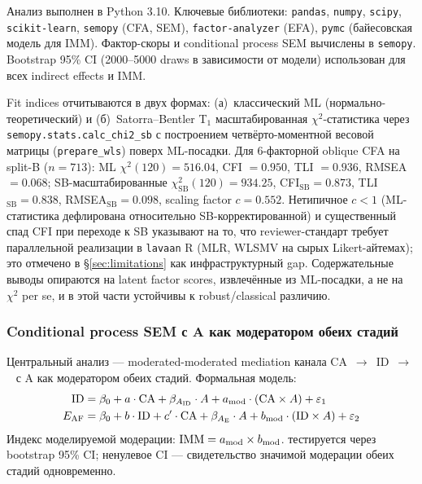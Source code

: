 Анализ выполнен в Python 3.10. Ключевые библиотеки: \texttt{pandas}, \texttt{numpy}, \texttt{scipy}, \texttt{scikit-learn}, \texttt{semopy} (CFA, SEM), \texttt{factor-analyzer} (EFA), \texttt{pymc} (байесовская модель для IMM). Фактор-скоры и conditional process SEM вычислены в \texttt{semopy}. Bootstrap 95\% CI (2000--5000 draws в зависимости от модели) использован для всех indirect effects и IMM.

Fit indices отчитываются в двух формах: (а)~классический ML (нормально-теоретический) и (б)~Satorra--Bentler T$_1$ масштабированная $\chi^2$-статистика через \texttt{semopy.stats.calc\_chi2\_sb} с построением четвёрто-моментной весовой матрицы (\texttt{prepare\_wls}) поверх ML-посадки. Для 6-факторной oblique CFA на split-B ($n = 713$): ML $\chi^2(120) = 516.04$, CFI $= 0.950$, TLI $= 0.936$, RMSEA $= 0.068$; SB-масштабированные $\chi^2_{\mathrm{SB}}(120) = 934.25$, CFI$_{\mathrm{SB}} = 0.873$, TLI$_{\mathrm{SB}} = 0.838$, RMSEA$_{\mathrm{SB}} = 0.098$, scaling factor $c = 0.552$. Нетипичное $c < 1$ (ML-статистика дефлирована относительно SB-корректированной) и существенный спад CFI при переходе к SB указывают на то, что reviewer-стандарт требует параллельной реализации в \texttt{lavaan} R (MLR, WLSMV на сырых Likert-айтемах); это отмечено в §\ref{sec:limitations} как инфраструктурный gap. Содержательные выводы опираются на latent factor scores, извлечённые из ML-посадки, а не на $\chi^2$ per se, и в этой части устойчивы к robust/classical различию.

\subsubsection{Conditional process SEM с A как модератором обеих стадий}
\label{subsubsec:cp_sem}

Центральный анализ --- moderated-moderated mediation канала CA~$\to$~ID~$\to$~\EAF{} с A как модератором обеих стадий. Формальная модель:
\begin{align}
\text{ID} &= \beta_0 + a \cdot \text{CA} + \beta_{A_{\text{ID}}} \cdot A + a_{\text{mod}} \cdot (\text{CA} \times A) + \varepsilon_1 \\
\text{\ensuremath{E_{\mathrm{AF}}}{}} &= \beta_0 + b \cdot \text{ID} + c' \cdot \text{CA} + \beta_{A_{\text{E}}} \cdot A + b_{\text{mod}} \cdot (\text{ID} \times A) + \varepsilon_2
\end{align}
Индекс моделируемой модерации: $\mathrm{IMM} = a_{\text{mod}} \times b_{\text{mod}}$. \IMM{} тестируется через bootstrap 95\% CI; ненулевое CI --- свидетельство значимой модерации обеих стадий одновременно.


